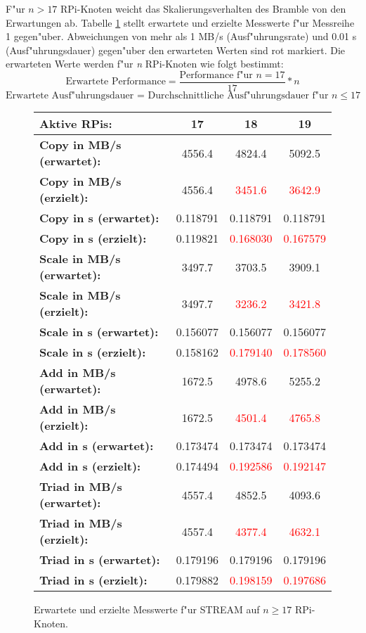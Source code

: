 F"ur $n > 17$ RPi-Knoten weicht das Skalierungsverhalten des Bramble von den Erwartungen ab. Tabelle \ref{fig:stream-abweichung} stellt erwartete und erzielte Messwerte f"ur Messreihe 1 gegen"uber. Abweichungen von mehr als 1 MB/s (Ausf"uhrungsrate) und 0.01 s (Ausf"uhrungsdauer) gegen"uber den erwarteten Werten sind rot markiert. Die erwarteten Werte werden f"ur \textit{n} RPi-Knoten wie folgt bestimmt: 
\[\text{Erwartete Performance} = \frac{\text{Performance f"ur }n=17}{17}\ast n\] 
\[\text{Erwartete Ausf"uhrungsdauer = Durchschnittliche Ausf"uhrungsdauer f"ur }n\leq 17\]
\begin{figure}
  \centering
  \begin{tabular}{|l|c|c|c|}
    \hline 
    \textbf{Aktive RPis:} & \textbf{17} & \textbf{18} & \textbf{19}\\ 
    \hline 
    \textbf{Copy in MB/s (erwartet):} & 4556.4 & 4824.4 & 5092.5\\
    \hline 
    \textbf{Copy in MB/s (erzielt):} & 4556.4 & \textcolor{red}{3451.6} & \textcolor{red}{3642.9}\\
    \hline 
    \textbf{Copy in s (erwartet):} & 0.118791 & 0.118791 & 0.118791\\
    \hline 
    \textbf{Copy in s (erzielt):} & 0.119821 & \textcolor{red}{0.168030} & \textcolor{red}{0.167579}\\
    \hline 
    \textbf{Scale in MB/s (erwartet):} & 3497.7 & 3703.5 & 3909.1\\
    \hline 
    \textbf{Scale in MB/s (erzielt):} & 3497.7 & \textcolor{red}{3236.2} & \textcolor{red}{3421.8}\\
    \hline 
	\textbf{Scale in s (erwartet):} & 0.156077 & 0.156077 & 0.156077\\
    \hline 
    \textbf{Scale in s (erzielt):} & 0.158162 & \textcolor{red}{0.179140} & \textcolor{red}{0.178560}\\
    \hline 
    \textbf{Add in MB/s (erwartet):} & 1672.5 & 4978.6 & 5255.2\\
    \hline 
    \textbf{Add in MB/s (erzielt):} & 1672.5 & \textcolor{red}{4501.4} & \textcolor{red}{4765.8}\\
    \hline 
    \textbf{Add in s (erwartet):} & 0.173474 & 0.173474 & 0.173474\\
    \hline 
    \textbf{Add in s (erzielt):} & 0.174494 & \textcolor{red}{0.192586} & \textcolor{red}{0.192147}\\
    \hline 
    \textbf{Triad in MB/s (erwartet):} & 4557.4 & 4852.5 & 4093.6\\
    \hline 
    \textbf{Triad in MB/s (erzielt):} & 4557.4 & \textcolor{red}{4377.4} & \textcolor{red}{4632.1}\\
    \hline 
    \textbf{Triad in s (erwartet):} & 0.179196 & 0.179196 & 0.179196\\
    \hline 
    \textbf{Triad in s (erzielt):} & 0.179882 & \textcolor{red}{0.198159} & \textcolor{red}{0.197686}\\
    \hline 
  \end{tabular}
  \caption{Erwartete und erzielte Messwerte f"ur STREAM auf $n\geq 17$ RPi-Knoten.}\label{fig:stream-abweichung}
\end{figure}


